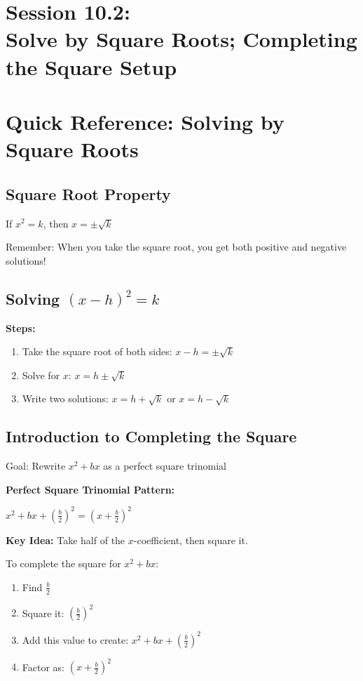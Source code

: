 \documentclass[12pt]{article}
\begin{document}
            \newpage

	\section*{Session 10.2: \\ Solve by Square Roots; Completing the Square Setup}

	\section*{Quick Reference: Solving by Square Roots}

		\subsection*{Square Root Property}

			If $x^2 = k$, then $x = \pm\sqrt{k}$

			Remember: When you take the square root, you get both positive and negative solutions!

		\subsection*{Solving $(x - h)^2 = k$}

			\textbf{Steps:}
			\begin{enumerate}
				\item Take the square root of both sides: $x - h = \pm\sqrt{k}$
				\item Solve for $x$: $x = h \pm\sqrt{k}$
				\item Write two solutions: $x = h + \sqrt{k}$ or $x = h - \sqrt{k}$
			\end{enumerate}

		\subsection*{Introduction to Completing the Square}

			Goal: Rewrite $x^2 + bx$ as a perfect square trinomial

			\textbf{Perfect Square Trinomial Pattern:}

			$x^2 + bx + \left(\frac{b}{2}\right)^2 = \left(x + \frac{b}{2}\right)^2$

			\textbf{Key Idea:} Take half of the $x$-coefficient, then square it.

			To complete the square for $x^2 + bx$:
			\begin{enumerate}
				\item Find $\frac{b}{2}$
				\item Square it: $\left(\frac{b}{2}\right)^2$
				\item Add this value to create: $x^2 + bx + \left(\frac{b}{2}\right)^2$
				\item Factor as: $\left(x + \frac{b}{2}\right)^2$
			\end{enumerate}
\end{document}

